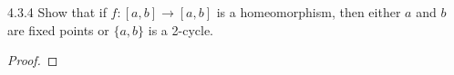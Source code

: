 \begin{problem}{4.3.4}
  Show that if $f: [a, b] \to [a,b]$ is a homeomorphism, then either $a$ and $b$
  are fixed points or $\{a, b\}$ is a 2-cycle.
\end{problem}

\begin{proof}
\end{proof}
\newpage

